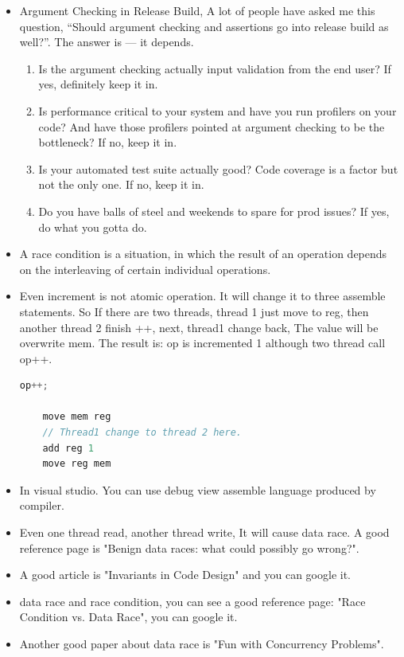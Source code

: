 \documentclass[a4paper,11pt,twoside]{book}
\begin{document}
\begin{itemize}
	\item Argument Checking in Release Build, A lot of people have asked me this question, “Should argument checking and assertions go into release build as well?”. The answer is — it depends.
	
	\begin{enumerate}
		\item Is the argument checking actually input validation from the end user? If yes, definitely keep it in.
		
		\item Is performance critical to your system and have you run profilers on your code? And have those profilers pointed at argument checking to be the bottleneck? If no, keep it in.
		
		\item Is your automated test suite actually good? Code coverage is a factor but not the only one. If no, keep it in.
		
		\item Do you have balls of steel and weekends to spare for prod issues? If yes, do what you gotta do.
	\end{enumerate}
	
	\item A race condition is a situation, in which the result of an operation depends on the interleaving of certain individual operations.
	
	\item Even increment is not atomic operation. It will change it to three assemble statements. So If there are two threads, thread 1 just move to reg, then another thread 2 finish ++, next, thread1 change back, The value will be overwrite mem. The result is: op is incremented 1 although two thread call op++.
\begin{lstlisting}[frame=single, language=c++]
	op++;
	
	move mem reg
	// Thread1 change to thread 2 here. 
	add reg 1
	move reg mem
\end{lstlisting}		
	
	\item In visual studio. You can use debug view assemble language produced by compiler. 
	
	\item Even one thread read, another thread write, It will cause data race. A good reference page is "Benign data races: what could possibly go wrong?". 
	
	\item A good article is "Invariants in Code Design" and you can google it.
	
	\item data race and race condition, you can see a good reference page: "Race Condition vs. Data Race", you can google it.
	
	\item Another good paper about data race is "Fun with Concurrency Problems".
	
\end{itemize}
\end{document}
